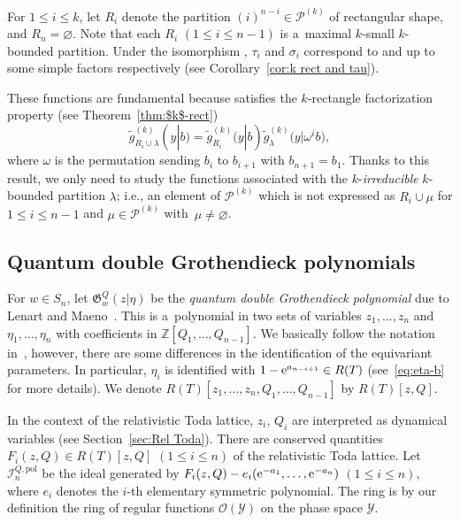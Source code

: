 \documentclass[10pt,a4paper]{amsart}
\numberwithin{equation}{section}
\newcommand{\Gro}[1]{\mathfrak{G}^Q_{#1}}
\newcommand{\la}{\lambda}
\newcommand{\Rep}{{R(T)}}
\newcommand{\Z}{\mathbb{Z}}
\theoremstyle{definition}
\begin{document}
For $1\le i\le k$, let $R_i$ denote the partition $(i)^{n-i}\in \mathscr{P}^{(k)}$ of rectangular shape, and $R_n=\varnothing$.
Note that each $R_i$ $(1\le i\le n-1)$ is a~maximal $k$-small $k$-bounded partition.
Under the isomorphism
\smash{$ \mathscr{O}(\mathscr{Z})
\cong \hat{\Lambda}^{\Rep}_{(n)}$},
$\tau_i$ and $\sigma_i$
correspond to  and  up to
some simple factors respectively (see Corollary~\ref{cor:k rect and tau}).

These functions are fundamental because
\smash{$\tilde{g}_{\la}^{(k)}(y|b)$} satisfies the $k$-rectangle factorization property (see Theorem~\ref{thm:$k$-rect})
\[
\tilde{g}_{R_i\cup \la}^{(k)}(y|b)=\tilde{g}_{R_i}^{(k)}(y|b)
\tilde{g}_{\la}^{(k)}\bigl(y|\omega^ib\bigr),
\]
where $\omega$ is the permutation sending $b_i$ to $b_{i+1}$ with $b_{n+1}=b_1$.
Thanks to this result, we only need to study the functions \smash{$\tilde{g}_\la^{(k)}(y|b)$} associated with the
$k$-\emph{irreducible} $k$-bounded partition $\la$; i.e., an element of $\mathscr{P}^{(k)}$ which is not expressed as $R_i\cup\mu$ for $1\le i\le n-1$ and $\mu\in \mathscr{P}^{(k)}$
with~${\mu\ne \varnothing}$.

\subsection{Quantum double Grothendieck polynomials}

For $w\in S_n$, let $\Gro{w}(z| \eta)$ be the \emph{quantum double
Grothendieck polynomial} due to Lenart and Maeno~\cite{LM}.
This is a~polynomial in two sets of variables
$z_1,\dots,z_n$ and $\eta_1,\dots,\eta_n$ with coefficients in
$\Z[Q_1,\dots,Q_{n-1}]$.
We basically follow the notation in~\cite{MNS2}, however,
there are some differences in the identification of the equivariant parameters.
In particular, $\eta_i$ is identified with $1-{\rm e}^{a_{n-i+1}}\in \Rep$ (see~\eqref{eq:eta-b} for more details).
We denote $\Rep[z_1,\dots,z_n,Q_1,\dots,Q_{n-1}]$ by $\Rep[z,Q]$.

In the context of the relativistic Toda lattice,
$z_i$, $Q_i$ are interpreted as dynamical variables (see Section~\ref{sec:Rel Toda}).
There are conserved quantities $F_i(z,Q)\in \Rep[z,Q]$ $(1\le i\le n)$ of the relativistic Toda lattice.
Let $\mathscr{I}_n^{Q,\mathrm{pol}}$ be the
ideal generated by $F_i(z,Q)-e_i({\rm e}^{-a_1},\dots,{\rm e}^{-a_n})$ $(1\le i\le n)$, where $e_i$ denotes the $i$-th elementary
symmetric polynomial.
The ring \smash{$\Rep[z,Q]/\mathscr{I}_n^{Q,\mathrm{pol}}$} is by our definition
the ring of regular functions $\mathscr{O}(\mathscr{Y})$ on the
phase space $\mathscr{Y}$.
\end{document}
